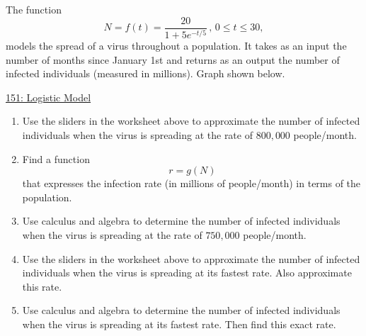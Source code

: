 \documentclass{ximera}
\begin{document}
\begin{question}  \label{Qhhfhnnnhtytt543}
The function
\[
       N = f(t) = \frac{20}{1+5e^{-t/5}} \, , \, 0\leq t\leq 30,
\]
models the spread of a virus throughout a population. It takes as an input the number of months since January 1st and returns as an output the number of infected individuals (measured in millions). Graph shown below.

\begin{onlineOnly}
    \begin{center}
\end{center}
\end{onlineOnly}

\href{https://www.desmos.com/calculator/ikis451wxu}{151: Logistic Model}

\begin{enumerate}
\item Use the sliders in the worksheet above to approximate the number of infected individuals when the virus is spreading at the rate of $800,000$ people/month.

\item Find a function 
\[
       r = g(N) 
\]
that expresses the infection rate (in millions of people/month) in terms of the population.

\item Use calculus and algebra to determine the number of infected individuals when the virus is spreading at the rate of $750,000$ people/month.

\item Use the sliders in the worksheet above to approximate the number of infected individuals when the virus is spreading at its fastest rate. Also approximate this rate.

\item Use calculus and algebra to determine the number of infected individuals when the virus is spreading at its fastest rate. Then find this exact rate.
\end{enumerate}


\end{question}
\end{document}
